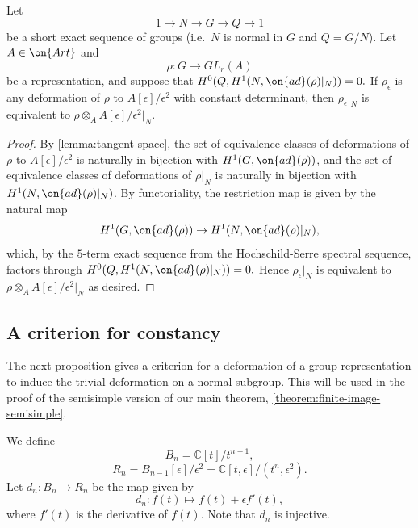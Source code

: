 \begin{lemma}
\notready\label{lemma:split-constancy}
	Let $$1\to N\to G\to Q\to 1$$ be a short exact sequence of groups (i.e.~$N$ is normal in $G$ and $Q=G/N$). Let $A\in\on{Art}$ and $$\rho: G\to GL_r(A)$$ be a representation, and suppose that $H^0(Q, H^1(N, \on{ad}(\rho)|_N))=0.$ If $\rho_\epsilon$ is any deformation of $\rho$ to $A[\epsilon]/\epsilon^2$ with constant determinant, then $\rho_\epsilon|_N$ is equivalent to $\rho\otimes_A A[\epsilon]/\epsilon^2|_N$.
\end{lemma}
\begin{proof}
	By \autoref{lemma:tangent-space}, the set of equivalence classes of deformations of $\rho$ to $A[\epsilon]/\epsilon^2$ is naturally in bijection with $H^1(G, \on{ad}(\rho))$, and the set of equivalence classes of deformations of $\rho|_N$ is naturally in bijection with $H^1(N, \on{ad}(\rho)|_N)$. By functoriality, the restriction map is given by the natural map $$H^1(G, \on{ad}(\rho))\to H^1(N, \on{ad}(\rho)|_N),$$ which, by the $5$-term exact sequence from the Hochschild-Serre spectral sequence, factors through $H^0(Q, H^1(N, \on{ad}(\rho)|_N))=0.$ Hence $\rho_\epsilon|_N$ is equivalent to $\rho\otimes_A A[\epsilon]/\epsilon^2|_N$ as desired.
\end{proof}

\subsection{A criterion for constancy}
The next proposition gives a criterion for a deformation of a group representation to induce the trivial deformation on a normal subgroup.
This will be used in the proof of the semisimple version of our main theorem,
\autoref{theorem:finite-image-semisimple}.

We define  $$B_n=\mathbb{C}[t]/t^{n+1},$$ $$R_n=B_{n-1}[\epsilon]/\epsilon^2=\mathbb{C}[t, \epsilon]/(t^n,\epsilon^2).$$ Let $d_n: B_n\to R_{n}$ be the map given by $$d_n: f(t)\mapsto f(t)+\epsilon f'(t),$$ where $f'(t)$ is the derivative of $f(t)$. Note that $d_n$ is injective.

